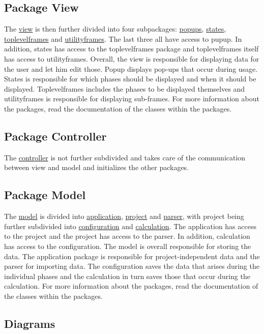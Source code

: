 \documentclass[parskip=full]{scrartcl} %
\begin{document}
\subsection{Package View}
The \hyperlink{view}{view} is then further divided into four subpackages: \hyperlink{popups}{popups}, \hyperlink{states}{states}, \hyperlink{toplevelframes}{toplevelframes} and \hyperlink{utilityframes}{utilityframes}. The last three all have access to pupup. In addition, states has access to the toplevelframes package and toplevelframes itself has access to utilityframes. Overall, the view is responsible for displaying data for the user and let him edit those. Popup displays pop-ups that occur during usage. States is responsible for which phases should be displayed and when it should be displayed. Toplevelframes includes the phases to be displayed themselves and utilityframes is responsible for displaying sub-frames. For more information about the packages, read the documentation of the classes within the packages.

\subsection{Package Controller}
The \hyperlink{controller}{controller} is not further subdivided and takes care of the communication between view and model and initializes the other packages.

\subsection{Package Model}
The \hyperlink{model}{model} is divided into \hyperlink{application}{application}, \hyperlink{project}{project} and \hyperlink{parser}{parser}, with project being further subdivided into \hyperlink{configuration}{configuration} and \hyperlink{calculation}{calculation}. The application has access to the project and the project has access to the parser. In addition, calculation has access to the configuration. The model is overall responsible for storing the data. The application package is responsible for project-independent data and the parser for importing data. The configuration saves the data that arises during the individual phases and the calculation in turn saves those that occur during the calculation. For more information about the packages, read the documentation of the classes within the packages.

\subsection{Diagrams}
\end{document}
